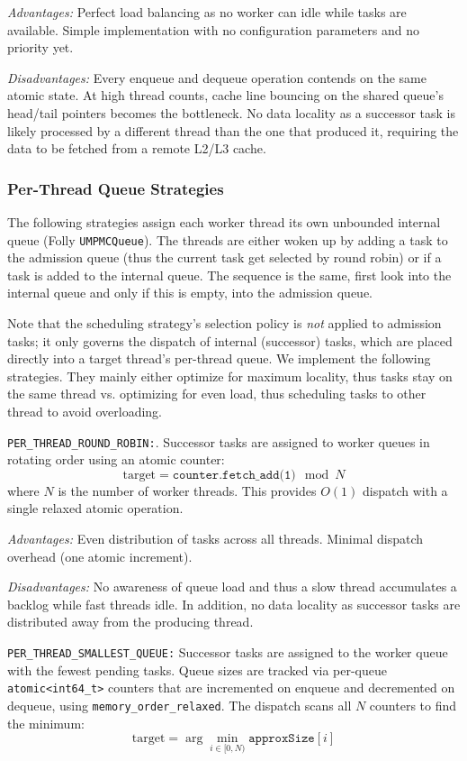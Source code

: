 \textit{Advantages:} Perfect load balancing as no worker can idle while tasks are available.
Simple implementation with no configuration parameters and no priority yet.

\textit{Disadvantages:} Every enqueue and dequeue operation contends on the same atomic state.
At high thread counts, cache line bouncing on the shared queue's head/tail pointers becomes the bottleneck.
No data locality as a successor task is likely processed by a different thread than the one that produced it, requiring the data to be fetched from a remote L2/L3 cache.

\subsubsection{Per-Thread Queue Strategies}
The following strategies assign each worker thread its own unbounded internal queue (Folly \texttt{UMPMCQueue}).
The threads are either woken up by adding a task to the admission queue (thus the current task get selected by round robin) or if a task is added to the internal queue. The sequence is the same, first look into the internal queue and only if this is empty, into the admission queue.

Note that the scheduling strategy's selection policy is \emph{not} applied to admission tasks; it only governs the dispatch of internal (successor) tasks, which are placed directly into a target thread's per-thread queue. We implement the following strategies. They mainly either optimize for maximum locality, thus tasks stay on the same thread vs. optimizing for even load, thus scheduling tasks to other thread to avoid overloading.

\texttt{PER\_THREAD\_ROUND\_ROBIN:}.
Successor tasks are assigned to worker queues in rotating order using an atomic counter:
\[
    \text{target} = \texttt{counter.fetch\_add(1)} \mod N
\]
where $N$ is the number of worker threads.
This provides $O(1)$ dispatch with a single relaxed atomic operation.

\textit{Advantages:} Even distribution of tasks across all threads.
Minimal dispatch overhead (one atomic increment).

\textit{Disadvantages:} No awareness of queue load and thus a slow thread accumulates a backlog while fast threads idle.
In addition, no data locality as successor tasks are distributed away from the producing thread.

\texttt{PER\_THREAD\_SMALLEST\_QUEUE:}
Successor tasks are assigned to the worker queue with the fewest pending tasks.
Queue sizes are tracked via per-queue \texttt{atomic<int64\_t>} counters that are incremented on enqueue and decremented on dequeue, using \texttt{memory\_order\_relaxed}.
The dispatch scans all $N$ counters to find the minimum:
\[
    \text{target} = \arg\min_{i \in [0,N)} \texttt{approxSize}[i]
\]


